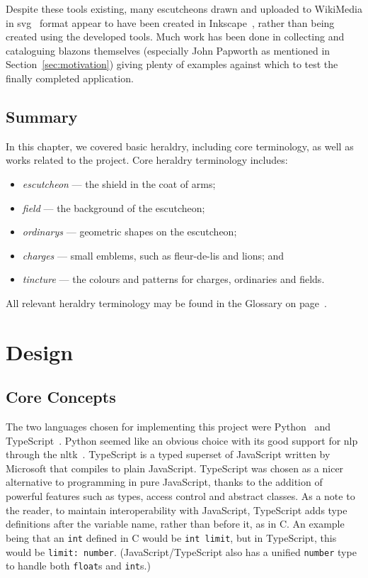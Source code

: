 \documentclass[nobib, a4paper, twoside, justified]{tufte-book}
\makeatletter
\newcommand{\svg}{\gls{svg}\@\xspace}
\newcommand{\charges}{\glspl{charge}\@\xspace}
\newcommand{\blazons}{\glspl{blazon}\@\xspace}
\makeatother
\begin{document}
Despite these tools existing, many escutcheons drawn and uploaded to WikiMedia in
\svg~\autocite{ferraiolo2000scalable} format appear to have been created in
Inkscape~\autocite{inkscape}, rather than being created using the developed tools. Much work has
been done in collecting and cataloguing \blazons themselves (especially John Papworth as
mentioned in Section~\ref{sec:motivation}) giving plenty of examples against which to test the
finally completed application.

\section{Summary}%
\label{sec:background_summary}

In this chapter, we covered basic heraldry, including core terminology, as well as works related to
the project. Core heraldry terminology includes:

\pagebreak%

\begin{itemize}
  \item \textit{\Gls{escutcheon}} --- the shield in the coat of arms;
  \item \textit{\Gls{field}} --- the background of the escutcheon;
  \item \textit{\Glspl{ordinary}} --- geometric shapes on the escutcheon;
  \item \textit{\Glspl{charge}} --- small emblems, such as fleur-de-lis and lions; and
  \item \textit{\Gls{tincture}} --- the colours and patterns for \charges, ordinaries and fields.
\end{itemize}

All relevant heraldry terminology may be found in the Glossary on page~\pageref{main}.

\chapter{Design}%
\label{cha:design}

\section{Core Concepts}%
\label{sec:core_concepts}

The two languages chosen for implementing this project were Python~\autocite{python} and
TypeScript~\autocite{typescript}. Python seemed like an obvious choice with its good support for
\gls{nlp} through the \gls{nltk}~\autocite{bird2004nltk}. TypeScript is a typed superset of
JavaScript written by Microsoft that compiles to plain JavaScript.  TypeScript was chosen as a
nicer alternative to programming in pure JavaScript, thanks to the addition of powerful features
such as types, access control and abstract classes. As a note to the reader, to maintain
interoperability with JavaScript, TypeScript adds type definitions after the variable name, rather
than before it, as in C. An example being that an \texttt{int} defined in C would be \texttt{int
limit}, but in TypeScript, this would be \texttt{limit: number}. (JavaScript/TypeScript also has a
unified \texttt{number} type to handle both \texttt{float}s and \texttt{int}s.)
\end{document}

